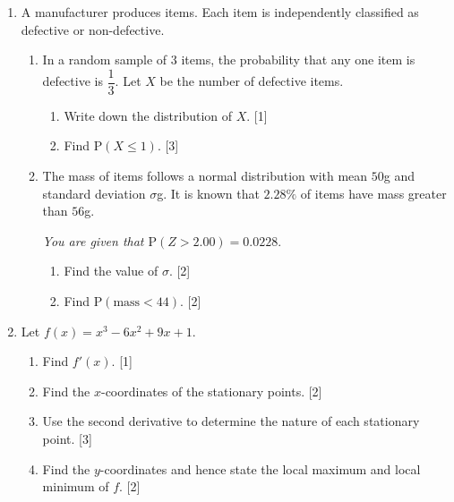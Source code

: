 \documentclass[12pt, twoside]{article}
\begin{document}
\begin{enumerate}[itemsep=0.2cm]
\newpage

\item A manufacturer produces items. Each item is independently classified as
defective or non-defective.

\begin{enumerate}[itemsep=0.15cm]
  \item In a random sample of 3 items, the probability that any one item is
        defective is $\dfrac{1}{3}$. Let $X$ be the number of defective items.
  \begin{enumerate}[itemsep=0.1cm]
    \item[(i)] Write down the distribution of $X$. \hfill [1]
    \item[(ii)] Find $\mathrm{P}(X \leq 1)$. \hfill [3]
  \end{enumerate}

  \medskip
  \item The mass of items follows a normal distribution with mean $50$\;g
        and standard deviation $\sigma$\;g. It is known that $2.28\%$ of items
        have mass greater than $56$\;g.

        \emph{You are given that $\mathrm{P}(Z > 2.00) = 0.0228$}.
  \begin{enumerate}[itemsep=0.1cm]
    \item[(i)] Find the value of $\sigma$. \hfill [2]
    \item[(ii)] Find $\mathrm{P}(\text{mass} < 44)$. \hfill [2]
  \end{enumerate}
\end{enumerate}


\newpage

\item Let $f(x) = x^3 - 6x^2 + 9x + 1$.

\begin{enumerate}[itemsep=0.15cm]
  \item Find $f'(x)$. \hfill [1]
  \item Find the $x$-coordinates of the stationary points. \hfill [2]
  \item Use the second derivative to determine the nature of each
        stationary point. \hfill [3]
  \item Find the $y$-coordinates and hence state the local maximum
        and local minimum of $f$. \hfill [2]
\end{enumerate}


\end{enumerate}
\end{document}

